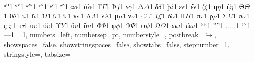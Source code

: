 {		{ᵘ}{{\textsuperscript{u}}}1 {ᵛ}{{\textsuperscript{v}}}1
		{ʷ}{{\textsuperscript{w}}}1 {ˣ}{{\textsuperscript{x}}}1
		{ʸ}{{\textsuperscript{y}}}1 {ᶻ}{{\textsuperscript{z}}}1
		{α}{{$\alpha$}}1 {ά}{{$\dot \alpha$}}1 {Γ}{{$\Gamma$}}1 {Þ}{{$\Thorn$}}1
		{γ}{{$\gamma$}}1 {Δ}{{$\Delta$}}1 {δ}{{$\delta$}}1 {þ}{{$\thorn$}}1
		{ε}{{$\epsilon$}}1 {έ}{{$\dot \epsilon$}}1 {ζ}{{$\zeta$}}1
		{η}{{$\eta$}}1 {ή}{{$\dot \eta$}}1 {Θ}{{$\Theta$}}1
		{θ}{{$\theta$}}1 {ι}{{$\iota$}}1 {ί}{{$\dot \iota$}}1
		{Ϊ}{{$\ddot I$}}1 {ϊ}{{$\ddot \iota$}}1 {ΐ}{{$\dddot \iota$}}1
		{κ}{{$\kappa$}}1 {Λ}{{$\Lambda$}}1 {λ}{{$\lambda$}}1
		{μ}{{$\mu$}}1 {ν}{{$\nu$}}1 {Ξ}{{$\Xi$}}1 {ξ}{{$\xi$}}1
		{ό}{{$\dot o$}}1 {Π}{{$\Pi$}}1 {π}{{$\pi$}}1 {ρ}{{$\rho$}}1
		{Σ}{{$\Sigma$}}1 {σ}{{$\sigma$}}1 {ς}{{$\varsigma$}}1 {τ}{{$\tau$}}1
		{υ}{{$\upsilon$}}1 {ύ}{{$\dot \upsilon$}}1 {Ϋ}{{$\ddot Y$}}1
		{ϋ}{{$\ddot \upsilon$}}1 {ΰ}{{$\dddot \upsilon$}}1
		{Φ}{{$\Phi$}}1 {φ}{{$\phi$}}1 {Ψ}{{$\Psi$}}1 {ψ}{{$\psi$}}1
		{Ω}{{$\Omega$}}1 {ω}{{$\omega$}}1 {ώ}{{$\dot \omega$}}1
		{“}{{``}}1 {”}{{''}}1 {…}{{$\ldots$}}1 {`}{\`}1 {–}{{--}}1 { }{{ }}1,
	numbers=left,
	numbersep={\sourcecodenumbersep pt},
	numberstyle=\sourcecodenumbersize\color{dkgray},
	postbreak=\mbox{$\hookrightarrow$\space},
	showspaces=false,
	showstringspaces=false,
	showtabs=false,
	stepnumber=1,
	stringstyle=\color{mauve},
	tabsize={\sourcecodetabsize}
}

